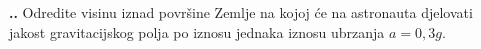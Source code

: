 

\noindent 
\textbf{
\thecjelina.\thezadatak.}
Odredite visinu iznad površine Zemlje na kojoj će na astronauta djelovati jakost gravitacijskog polja po 
iznosu jednaka iznosu ubrzanja $a=0,3g$.


